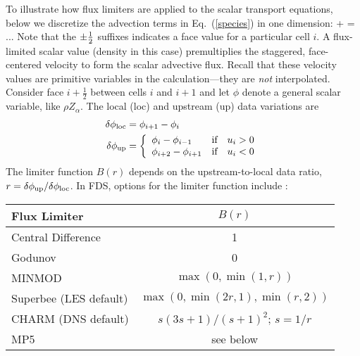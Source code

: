 To illustrate how flux limiters are applied to the scalar transport equations, below we discretize the advection terms in Eq.~(\ref{species}) in one dimension:
\be  {}
    +  = ...
\ee
Note that the $\pm\frac{1}{2}$ suffixes indicates a face value for a particular cell $i$. A flux-limited scalar value (density in this case) premultiplies the staggered, face-centered velocity to form the scalar advective flux.  Recall that these velocity values are primitive variables in the calculation---they are \emph{not} interpolated.
Consider face $i+\frac{1}{2}$ between cells $i$ and $i+1$ and let $\phi$ denote a general scalar variable, like $\rho Z_\alpha$.  The local (loc) and upstream (up) data variations are
\begin{align}
\delta \phi_{\rm loc} &= \phi_{i+1}-\phi_i \\
\delta \phi_{\rm up}  &= \left\{ \begin{array}{ll} \phi_i-\phi_{i-1} & \mbox{if} \quad u_i>0 \\ \phi_{i+2}-\phi_{i+1} & \mbox{if} \quad u_i<0 \end{array} \right.
\end{align}
The limiter function $B(r)$ depends on the upstream-to-local data ratio, $r=\delta \phi_{\rm up}/\delta \phi_{\rm loc}$. In FDS, options for the limiter function include \cite{Toro}:
\begin{table}[H]
\begin{center}
\begin{tabular}{lc}
Flux Limiter                           & $B(r)$                         \\
\hline
Central Difference                     & 1                              \\
Godunov                                & 0                              \\
MINMOD                                 & $\max(0,\min(1,r))$            \\
Superbee \cite{Roe:1986} (LES default) & $\max(0,\min(2r,1),\min(r,2))$ \\
CHARM \cite{Zhou:1995} (DNS default)   & $s(3s+1)/(s+1)^2$; $s=1/r$     \\
MP5 \cite{Suresh:1997}                 & see below
\end{tabular}
\end{center}
\end{table}
